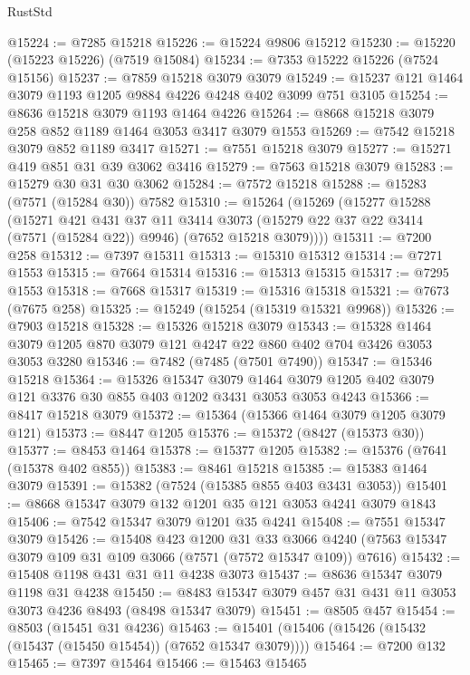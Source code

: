 \begin{lexlean}{RustStd}
\begin{coremodule}
@15224 := @7285 @15218
@15226 := @15224 @9806 @15212
@15230 := @15220 (@15223 @15226) (@7519 @15084)
@15234 := @7353 @15222 @15226 (@7524 @15156)
@15237 := @7859 @15218 @3079 @3079
@15249 := @15237 @121 @1464 @3079 @1193 @1205 @9884 @4226 @4248 @402 @3099 @751 @3105
@15254 := @8636 @15218 @3079 @1193 @1464 @4226
@15264 := @8668 @15218 @3079 @258 @852 @1189 @1464 @3053 @3417 @3079 @1553
@15269 := @7542 @15218 @3079 @852 @1189 @3417
@15271 := @7551 @15218 @3079
@15277 := @15271 @419 @851 @31 @39 @3062 @3416
@15279 := @7563 @15218 @3079
@15283 := @15279 @30 @31 @30 @3062
@15284 := @7572 @15218
@15288 := @15283 (@7571 (@15284 @30)) @7582
@15310 := @15264
    (@15269
      (@15277
        @15288
        (@15271
          @421
          @431
          @37
          @11
          @3414
          @3073
          (@15279 @22 @37 @22 @3414 (@7571 (@15284 @22)) @9946)
          (@7652 @15218 @3079))))
@15311 := @7200 @258
@15312 := @7397 @15311
@15313 := @15310 @15312
@15314 := @7271 @1553
@15315 := @7664 @15314
@15316 := @15313 @15315
@15317 := @7295 @1553
@15318 := @7668 @15317
@15319 := @15316 @15318
@15321 := @7673 (@7675 @258)
@15325 := @15249 (@15254 (@15319 @15321 @9968))
@15326 := @7903 @15218
@15328 := @15326 @15218 @3079
@15343 := @15328 @1464 @3079 @1205 @870 @3079 @121 @4247 @22 @860 @402 @704 @3426 @3053 @3053 @3280
@15346 := @7482 (@7485 (@7501 @7490))
@15347 := @15346 @15218
@15364 := @15326
    @15347
    @3079
    @1464
    @3079
    @1205
    @402
    @3079
    @121
    @3376
    @30
    @855
    @403
    @1202
    @3431
    @3053
    @3053
    @4243
@15366 := @8417 @15218 @3079
@15372 := @15364 (@15366 @1464 @3079 @1205 @3079 @121)
@15373 := @8447 @1205
@15376 := @15372 (@8427 (@15373 @30))
@15377 := @8453 @1464
@15378 := @15377 @1205
@15382 := @15376 (@7641 (@15378 @402 @855))
@15383 := @8461 @15218
@15385 := @15383 @1464 @3079
@15391 := @15382 (@7524 (@15385 @855 @403 @3431 @3053))
@15401 := @8668 @15347 @3079 @132 @1201 @35 @121 @3053 @4241 @3079 @1843
@15406 := @7542 @15347 @3079 @1201 @35 @4241
@15408 := @7551 @15347 @3079
@15426 := @15408
    @423
    @1200
    @31
    @33
    @3066
    @4240
    (@7563 @15347 @3079 @109 @31 @109 @3066 (@7571 (@7572 @15347 @109)) @7616)
@15432 := @15408 @1198 @431 @31 @11 @4238 @3073
@15437 := @8636 @15347 @3079 @1198 @31 @4238
@15450 := @8483 @15347 @3079 @457 @31 @431 @11 @3053 @3073 @4236 @8493 (@8498 @15347 @3079)
@15451 := @8505 @457
@15454 := @8503 (@15451 @31 @4236)
@15463 := @15401 (@15406 (@15426 (@15432 (@15437 (@15450 @15454)) (@7652 @15347 @3079))))
@15464 := @7200 @132
@15465 := @7397 @15464
@15466 := @15463 @15465

\end{coremodule}
\end{lexlean}
